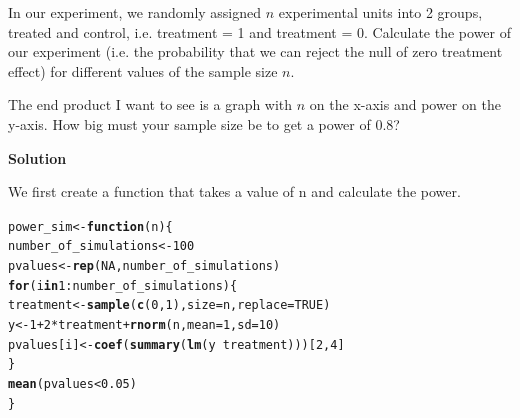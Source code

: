 \documentclass{article}\usepackage[]{graphicx}\usepackage[]{color}
\makeatletter
\newcommand{\hlnum}[1]{\textcolor[rgb]{0.686,0.059,0.569}{#1}}%
\newcommand{\hlopt}[1]{\textcolor[rgb]{0,0,0}{#1}}%
\newcommand{\hlstd}[1]{\textcolor[rgb]{0.345,0.345,0.345}{#1}}%
\newcommand{\hlkwa}[1]{\textcolor[rgb]{0.161,0.373,0.58}{\textbf{#1}}}%
\newcommand{\hlkwb}[1]{\textcolor[rgb]{0.69,0.353,0.396}{#1}}%
\newcommand{\hlkwc}[1]{\textcolor[rgb]{0.333,0.667,0.333}{#1}}%
\newcommand{\hlkwd}[1]{\textcolor[rgb]{0.737,0.353,0.396}{\textbf{#1}}}%
\newenvironment{kframe}{%
 \def\at@end@of@kframe{}%
 \ifinner\ifhmode%
  \def\at@end@of@kframe{\end{minipage}}%
  \begin{minipage}{\columnwidth}%
 \fi\fi%
 \def\FrameCommand##1{\hskip\@totalleftmargin \hskip-\fboxsep
 \colorbox{shadecolor}{##1}\hskip-\fboxsep
     \hskip-\linewidth \hskip-\@totalleftmargin \hskip\columnwidth}%
 \MakeFramed {\advance\hsize-\width
   \@totalleftmargin\z@ \linewidth\hsize
   \@setminipage}}%
 {\par\unskip\endMakeFramed%
 \at@end@of@kframe}
\newenvironment{knitrout}{}{} %
\makeatother
\begin{document}
In our experiment, we randomly assigned $n$ experimental units into 2 groups, treated and control, i.e. treatment = 1 and treatment = 0. Calculate the power of our experiment (i.e. the probability that we can reject the null of zero treatment effect) for different values of the sample size $n$.

The end product I want to see is a graph with $n$ on the x-axis and power on the y-axis. How big must your sample size be to get a power of 0.8?

\textbf{Solution}

We first create a function that takes a value of n and calculate the power.
\begin{knitrout}
\color{fgcolor}\begin{kframe}
\begin{alltt}
\hlstd{power_sim} \hlkwb{<-} \hlkwa{function}\hlstd{(}\hlkwc{n}\hlstd{) \{}
  \hlstd{number_of_simulations} \hlkwb{<-} \hlnum{100}
  \hlstd{pvalues} \hlkwb{<-} \hlkwd{rep}\hlstd{(}\hlnum{NA}\hlstd{, number_of_simulations)}
  \hlkwa{for} \hlstd{(i} \hlkwa{in} \hlnum{1}\hlopt{:}\hlstd{number_of_simulations) \{}
    \hlstd{treatment} \hlkwb{<-} \hlkwd{sample}\hlstd{(}\hlkwd{c}\hlstd{(}\hlnum{0}\hlstd{,} \hlnum{1}\hlstd{),} \hlkwc{size} \hlstd{= n,} \hlkwc{replace} \hlstd{=} \hlnum{TRUE}\hlstd{)}
    \hlstd{y} \hlkwb{<-} \hlnum{1} \hlopt{+} \hlnum{2} \hlopt{*} \hlstd{treatment} \hlopt{+} \hlkwd{rnorm}\hlstd{(n,} \hlkwc{mean} \hlstd{=} \hlnum{1}\hlstd{,} \hlkwc{sd} \hlstd{=} \hlnum{10}\hlstd{)}
    \hlstd{pvalues[i]} \hlkwb{<-} \hlkwd{coef}\hlstd{(}\hlkwd{summary}\hlstd{(}\hlkwd{lm}\hlstd{(y} \hlopt{~} \hlstd{treatment)))[}\hlnum{2}\hlstd{,} \hlnum{4}\hlstd{]}
  \hlstd{\}}
  \hlkwd{mean}\hlstd{(pvalues} \hlopt{<} \hlnum{0.05}\hlstd{)}
\hlstd{\}}
\end{alltt}
\end{kframe}
\end{knitrout}
\end{document}
